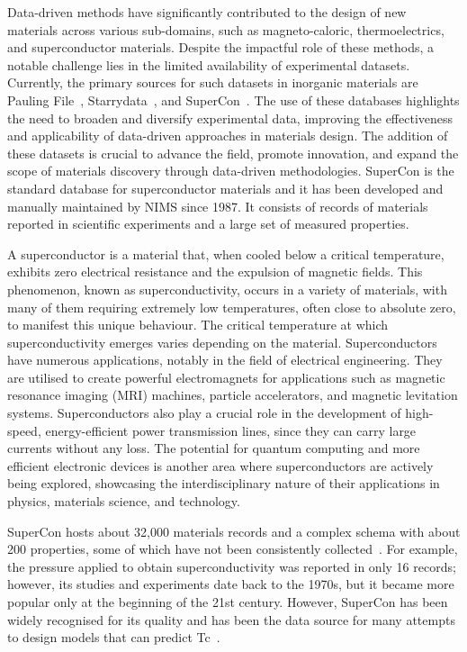 Data-driven methods have significantly contributed to the design of new materials across various sub-domains, such as magneto-caloric, thermoelectrics, and superconductor materials. Despite the impactful role of these methods, a notable challenge lies in the limited availability of experimental datasets. 
Currently, the primary sources for such datasets in inorganic materials are Pauling File~\cite{Blokhin2018ThePF_paulingFile}, Starrydata~\cite{katsura2019data}, and SuperCon~\cite{ishii2023structuring}. 
The use of these databases highlights the need to broaden and diversify experimental data, improving the effectiveness and applicability of data-driven approaches in materials design. The addition of these datasets is crucial to advance the field, promote innovation, and expand the scope of materials discovery through data-driven methodologies.
SuperCon is the standard database for superconductor materials and it has been developed and manually maintained by NIMS since 1987. 
It consists of records of materials reported in scientific experiments and a large set of measured properties. 

A superconductor is a material that, when cooled below a critical temperature, exhibits zero electrical resistance and the expulsion of magnetic fields. This phenomenon, known as superconductivity, occurs in a variety of materials, with many of them requiring extremely low temperatures, often close to absolute zero, to manifest this unique behaviour. The critical temperature at which superconductivity emerges varies depending on the material. Superconductors have numerous applications, notably in the field of electrical engineering. They are utilised to create powerful electromagnets for applications such as magnetic resonance imaging (MRI) machines, particle accelerators, and magnetic levitation systems. Superconductors also play a crucial role in the development of high-speed, energy-efficient power transmission lines, since they can carry large currents without any loss. The potential for quantum computing and more efficient electronic devices is another area where superconductors are actively being explored, showcasing the interdisciplinary nature of their applications in physics, materials science, and technology.

SuperCon hosts about 32,000 materials records and a complex schema with about 200 properties, some of which have not been consistently collected~\cite{sommer20223dsc}. 
For example, the pressure applied to obtain superconductivity was reported in only 16 records; however, its studies and experiments date back to the 1970s, but it became more popular only at the beginning of the 21st century.  
However, SuperCon has been widely recognised for its quality and has been the data source for many attempts to design models that can predict Tc~\cite{stanev_machine_2017, le2020critical, Hamlin2019SuperconductivityNR}. 

